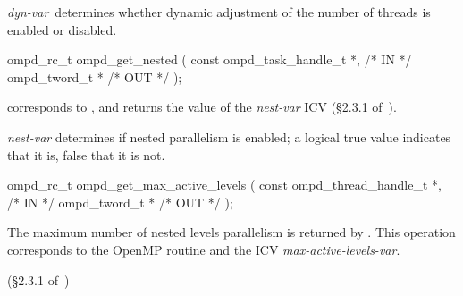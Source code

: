 \argdesc
\emph{dyn-var}~determines whether dynamic adjustment of the number
of threads is enabled or disabled.

\crossreferences


\summary

\format
\ccppspecificstart
\begin{boxedcode}
ompd\_rc\_t ompd\_get\_nested (
  const ompd\_task\_handle\_t  *,                           /* IN */
  ompd\_tword\_t              *                                   /* OUT */
);
\end{boxedcode}
\ccppspecificend

\descr
{} corresponds to ,
and returns the value of the \emph{nest-var} ICV (\S2.3.1 of~\cite{OpenMP}).

\argdesc
\emph{nest-var} determines if nested parallelism is enabled;
a logical true value indicates that it is, false that it is not.

\crossreferences


\summary

\format
\ccppspecificstart
\begin{boxedcode}
ompd\_rc\_t ompd\_get\_max\_active\_levels (
  const ompd\_thread\_handle\_t  *,                       /* IN */
  ompd\_tword\_t                *                                 /* OUT */
);
\end{boxedcode}
\ccppspecificend

\descr
The maximum number of nested levels parallelism is returned by
.
This operation corresponds to the OpenMP routine
and the ICV \emph{max-active-levels-var}.%

\argdesc

\crossreferences
(\S2.3.1 of~\cite{OpenMP})


%	
%	

